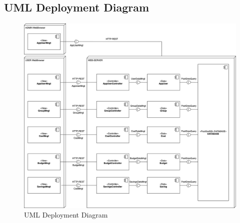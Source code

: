 \subsection{UML Deployment Diagram}

\begin{figure}[H]
    \centering
    \includegraphics[width=1.1\textwidth, trim=3cm 0cm 1cm 0cm]{images/DeployementDiagramIterazione3.drawio.png}
    \caption{UML Deployment Diagram}
    \label{fig:uml-deployment-diagram}
\end{figure}

